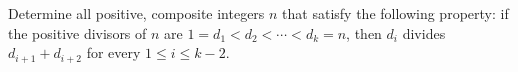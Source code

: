 Determine all positive, composite integers $n$ that satisfy the following property: if the positive divisors of $n$ are $1 = d_1 < d_2 < \cdots < d_k = n$, then $d_i$ divides $d_{i+1} + d_{i+2}$ for every $1 \leq i \leq k-2$.
